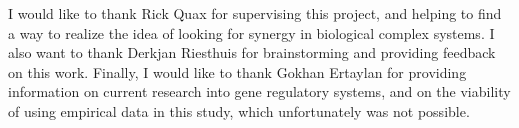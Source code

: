 \documentclass[../main.tex]{subfiles}
\begin{document}
I would like to thank Rick Quax for supervising this project, and helping to find a way to realize the idea of looking for synergy in biological complex systems.
I also want to thank Derkjan Riesthuis for brainstorming and providing feedback on this work.
Finally, I would like to thank Gokhan Ertaylan for providing information on current research into gene regulatory systems, and on the viability of using empirical data in this study, which unfortunately was not possible.
\end{document}
